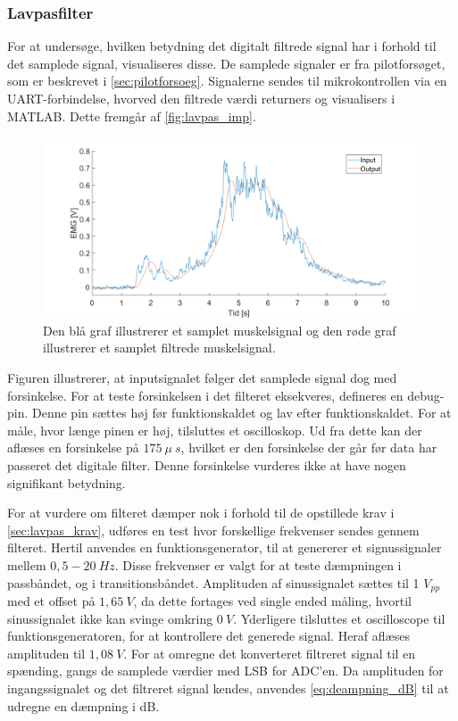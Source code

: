 \subsubsection{Lavpasfilter} \label{sec:lavpas_test}
For at undersøge, hvilken betydning det digitalt filtrede signal har i forhold til det samplede signal, visualiseres disse. De samplede signaler er fra pilotforsøget, som er beskrevet i \autoref{sec:pilotforsoeg}. Signalerne sendes til mikrokontrollen via en UART-forbindelse, hvorved den filtrede værdi returners og visualisers i MATLAB. Dette fremgår af \autoref{fig:lavpas_imp}.

\begin{figure}[H]
\centering
\includegraphics[width=1\textwidth]{figures/EMG_test}
\caption{Den blå graf illustrerer et samplet muskelsignal og den røde graf illustrerer et samplet filtrede muskelsignal.}
\label{fig:lavpas_imp}
\end{figure}

\noindent
Figuren illustrerer, at inputsignalet følger det samplede signal dog med forsinkelse. For at teste forsinkelsen i det filteret eksekveres, defineres en debug-pin. Denne pin sættes høj før funktionskaldet og lav efter funktionskaldet. For at måle, hvor længe pinen er høj, tilsluttes et oscilloskop. Ud fra dette kan der aflæses en forsinkelse på $175~\mu~s$, hvilket er den forsinkelse der går før data har passeret det digitale filter. Denne forsinkelse vurderes ikke at have nogen signifikant betydning.

For at vurdere om filteret dæmper nok i forhold til de opstillede krav i \autoref{sec:lavpas_krav}, udføres en test hvor forskellige frekvenser sendes gennem filteret. Hertil anvendes en funktionsgenerator, til at genererer et signussignaler mellem $0,5-20~Hz$. Disse frekvenser er valgt for at teste dæmpningen i passbåndet, og i transitionsbåndet.  
Amplituden af sinussignalet sættes til 1 $V_{pp}$ med et offset på $1,65~V$, da dette fortages ved single ended måling, hvortil sinussignalet ikke kan svinge omkring $0~V$. Yderligere tilsluttes et oscilloscope til funktionsgeneratoren, for at kontrollere det generede signal. Heraf aflæses amplituden til $1,08~V$.  
For at omregne det konverteret filtreret signal til en spænding, gangs de samplede værdier med LSB for ADC'en. 
Da amplituden for ingangssignalet og det filtreret signal kendes, anvendes \autoref{eq:deampning_dB} til at udregne en dæmpning i dB.

